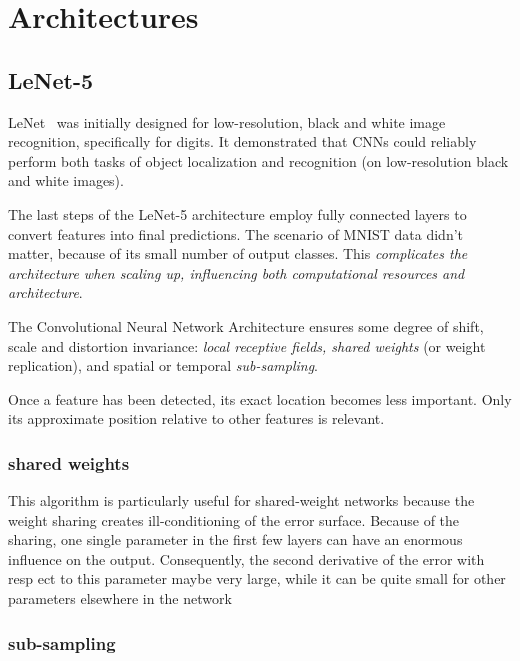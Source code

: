 \documentclass[11pt]{article}
\begin{document}


\tableofcontents

\clearpage

\section{Architectures}

\subsection{LeNet-5}

LeNet~\cite{LeNet} was initially designed for low-resolution, black and white image recognition, specifically for digits. It demonstrated that CNNs could reliably perform both tasks of object localization and recognition (on low-resolution black and white images).

The last steps of the LeNet-5 architecture employ fully connected layers to convert features into final predictions. The scenario of MNIST data didn't matter, because of its small number of output classes. This \textit{complicates the architecture when scaling up, influencing both computational resources and architecture}.

The Convolutional Neural Network Architecture ensures some degree of shift, scale and distortion invariance: \textit{local receptive fields, shared weights} (or weight replication), and spatial or temporal \textit{sub-sampling}.

Once a feature has been detected, its exact location
becomes less important. Only its approximate position
relative to other features is relevant.

\subsubsection{shared weights}

This algorithm is particularly useful for shared-weight networks because the weight sharing creates ill-conditioning of the error surface. Because of the sharing, one single parameter in the first few layers can have an enormous influence on the output. Consequently, the second derivative of the error with resp ect to this parameter maybe very large, while it can be quite small for other parameters elsewhere in the network

\subsubsection{sub-sampling}
\end{document}

